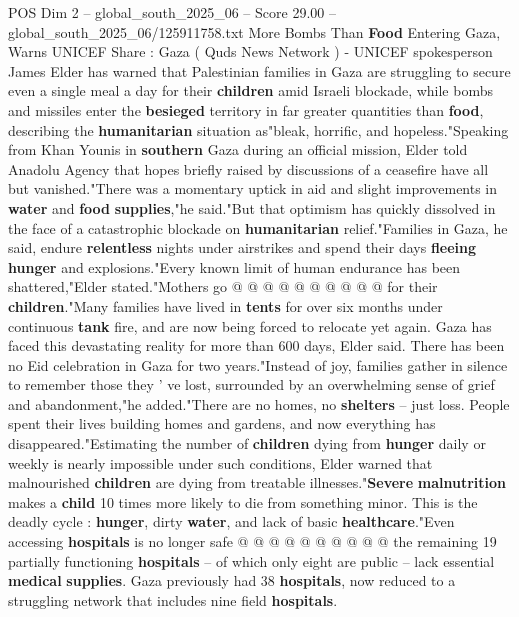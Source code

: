 \begin{textsample}{POS Dim 2 – global\_south\_2025\_06 – Score 29.00 – global\_south\_2025\_06/125911758.txt}  \label{ex:f2_pos_086}
More Bombs Than \textbf{Food} Entering Gaza, Warns UNICEF Share : Gaza ( Quds News Network ) - UNICEF spokesperson James Elder has warned that Palestinian families in Gaza are struggling to secure even a single meal a day for their \textbf{children} amid Israeli blockade, while bombs and missiles enter the \textbf{besieged} territory in far greater quantities than \textbf{food}, describing the \textbf{humanitarian} situation as"bleak, horrific, and hopeless."Speaking from Khan Younis in \textbf{southern} Gaza during an official mission, Elder told Anadolu Agency that hopes briefly raised by discussions of a ceasefire have all but vanished."There was a momentary uptick in aid and slight improvements in \textbf{water} and \textbf{food} \textbf{supplies},"he said."But that optimism has quickly dissolved in the face of a catastrophic blockade on \textbf{humanitarian} relief."Families in Gaza, he said, endure \textbf{relentless} nights under airstrikes and spend their days \textbf{fleeing} \textbf{hunger} and explosions."Every known limit of human endurance has been shattered,"Elder stated."Mothers go @ @ @ @ @ @ @ @ @ @ for their \textbf{children}."Many families have lived in \textbf{tents} for over six months under continuous \textbf{tank} fire, and are now being forced to relocate yet again.
Gaza has faced this devastating reality for more than 600 days, Elder said.
There has been no Eid celebration in Gaza for two years."Instead of joy, families gather in silence to remember those they ' ve lost, surrounded by an overwhelming sense of grief and abandonment,"he added."There are no homes, no \textbf{shelters} -- just loss.
People spent their lives building homes and gardens, and now everything has disappeared."Estimating the number of \textbf{children} dying from \textbf{hunger} daily or weekly is nearly impossible under such conditions, Elder warned that malnourished \textbf{children} are dying from treatable illnesses."\textbf{Severe} \textbf{malnutrition} makes a \textbf{child} 10 times more likely to die from something minor.
This is the deadly cycle : \textbf{hunger}, dirty \textbf{water}, and lack of basic \textbf{healthcare}."Even accessing \textbf{hospitals} is no longer safe @ @ @ @ @ @ @ @ @ @ the remaining 19 partially functioning \textbf{hospitals} -- of which only eight are public -- lack essential \textbf{medical} \textbf{supplies}.
Gaza previously had 38 \textbf{hospitals}, now reduced to a struggling network that includes nine field \textbf{hospitals}.

\end{textsample}
